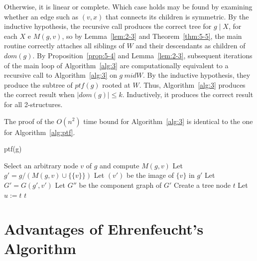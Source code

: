 Otherwise, it is linear or complete.
Which case holds may be found by examining whether an edge such as $(v, x)$ that connects its children is symmetric.
By the inductive hypothesis, the recursive call produces the correct tree for $g \mid X$, for each $X$ e $M(g,v)$, so by Lemma~\ref{lem:2-3} and Theorem~\ref{thm:5-5}, the main routine correctly attaches all siblings of $W$ and their descendants as children of $dom(g)$.
By Proposition~\ref{prop:5-4} and Lemma~\ref{lem:2-3}, subsequent iterations of the main loop of Algorithm~\ref{alg:3} are computationally equivalent to a recursive call to Algorithm~\ref{alg:3} on $g \ mid W$.
By the inductive hypothesis, they produce the subtree of $ptf(g)$ rooted at $W$.
Thus, Algorithm~\ref{alg:3} produces the correct result when $\mid dom(g) \mid \leq k$.
Inductively, it produces the correct result for all 2-structures.

The proof of the $O(n^2)$ time bound for Algorithm~\ref{alg:3} is identical to the one for Algorithm~\ref{alg:ptf}.

\begin{algorithm}[H]
    \caption{ptf(g)}
    \label{alg:3}
    Select an arbitrary node $v$ of $g$ and compute $M(g, v)$\;
    Let $g' = g / (M(g, v) \cup \{\{v\}\})$\;
    Let $(v')$ be the image of $\{v\}$ in $g'$\;
    Let $G' = G(g', v')$\;
    Let $G''$ be the component graph of $G'$\;
    Create a tree node $t$\;
    Let $u := t$\;
    \Return $t$\;
\end{algorithm}


\section{Advantages of Ehrenfeucht's Algorithm}\label{sec:advantages-of-ehrenfeucht's-algorithm}

